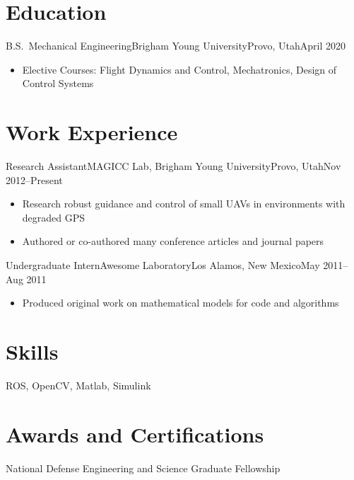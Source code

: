 \documentclass{resume_2}
\begin{document}
\address{435 CTB, Provo, Utah 84606}
\maketitle

\section{Education}

\begin{entry}{B.S.~Mechanical Engineering}{Brigham Young University}{Provo, Utah}{April 2020}
	\begin{itemize}
		\item Elective Courses: Flight Dynamics and Control, Mechatronics, Design of Control Systems
	\end{itemize}
\end{entry}

\section{Work Experience}

\begin{entry}{Research Assistant}{MAGICC Lab, Brigham Young University}{Provo, Utah}{Nov 2012--Present}
	\begin{itemize}
		\item Research robust guidance and control of small UAVs in environments with degraded GPS
		\item Authored or co-authored many conference articles and journal papers
	\end{itemize}
\end{entry}

\begin{entry}{Undergraduate Intern}{Awesome Laboratory}{Los Alamos, New Mexico}{May 2011--Aug 2011}
	\begin{itemize}
		\item Produced original work on mathematical models for code and algorithms
	\end{itemize}
\end{entry}




\section{Skills}
ROS, OpenCV, Matlab, Simulink

\section{Awards and Certifications}
National Defense Engineering and Science Graduate Fellowship

\end{document}

